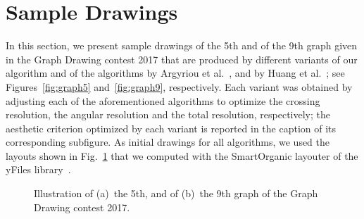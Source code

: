 \documentclass{comjnl}
\begin{document}
\section{Sample Drawings}
\label{app:samples}

In this section, we present sample drawings of the 5th and of the 9th graph given in the Graph Drawing contest 2017 that are produced by different variants of our algorithm and of the algorithms by Argyriou et al.~\cite{DBLP:journals/cj/ArgyriouBS13}, and by Huang et al.~\cite{DBLP:journals/vlc/HuangEHL13}; see Figures~\ref{fig:graph5} and~\ref{fig:graph9}, respectively. Each variant was obtained by adjusting each of the aforementioned algorithms to optimize the crossing resolution, the angular resolution and the total resolution, respectively; the aesthetic criterion optimized by each variant is reported in the caption of its corresponding subfigure. As initial drawings for all algorithms, we used the layouts shown in Fig.~\ref{fig:graph5And9-yfiles} that we computed with the SmartOrganic layouter of the yFiles library~\cite{DBLP:books/sp/04/WieseE004}.

\begin{figure}[t]
\centering
{}

\caption{Illustration of 
(a)~the 5th, and of
(b)~the 9th graph of the Graph Drawing contest 2017.}
\label{fig:graph5And9-yfiles}
\end{figure}

\end{document}
